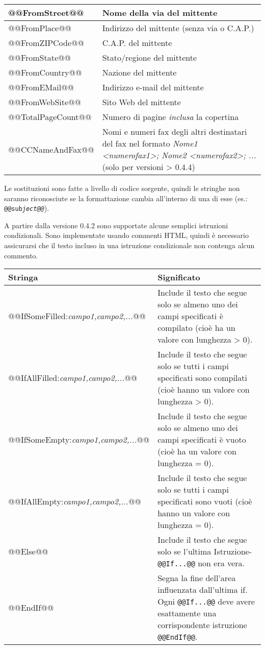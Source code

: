 \documentclass[a4paper,10pt]{scrartcl}
\begin{document}
\begin{center}
\begin{tabular}{|l|p{}|}
\ttfamily @@FromStreet@@ & Nome della via del mittente \\\hline
\ttfamily @@FromPlace@@ & Indirizzo del mittente (senza via o C.A.P.)\\\hline
\ttfamily @@FromZIPCode@@ & C.A.P. del mittente \\\hline
\ttfamily @@FromState@@ & Stato/regione del mittente\\\hline
\ttfamily @@FromCountry@@ & Nazione del mittente\\\hline
\ttfamily @@FromEMail@@ & Indirizzo e-mail del mittente\\\hline
\ttfamily @@FromWebSite@@ & Sito Web del mittente\\\hline
\ttfamily @@TotalPageCount@@ & Numero di pagine \textit{inclusa} la copertina \\\hline
\ttfamily @@CCNameAndFax@@ & Nomi e numeri fax degli altri destinatari del fax nel formato \textit{Nome1 <numerofax1>; Nome2 <numerofax2>; ...} (solo per versioni > 0.4.4)\\\hline
\end{tabular}
\end{center}

Le sostituzioni sono fatte a livello di codice sorgente, quindi le stringhe non saranno riconosciute se la formattazione cambia all'interno di una di esse (es.: \texttt{@@sub\textit{ject@@}}).

A partire dalla versione 0.4.2 sono supportate alcune semplici istruzioni condizionali. Sono implementate usando commenti HTML, quindi è necessario assicurarsi che il testo incluso in una istruzione condizionale non contenga alcun commento.
\begin{center}
\begin{tabular}{|l|p{}|}
\hline
\bfseries Stringa & \bfseries Significato \\
\hline\hline
\ttfamily @@IfSomeFilled:\textit{campo1,campo2,...}@@ & Include il testo che segue solo se almeno uno dei campi specificati è compilato (cioè ha un valore con lunghezza > 0).\\\hline
\ttfamily @@IfAllFilled:\textit{campo1,campo2,...}@@ & Include il testo che segue solo se tutti i campi specificati sono compilati (cioè hanno un valore con lunghezza > 0).\\\hline
\ttfamily @@IfSomeEmpty:\textit{campo1,campo2,...}@@ & Include il testo che segue solo se almeno uno dei campi specificati è vuoto (cioè ha un valore con lunghezza = 0).\\\hline
\ttfamily @@IfAllEmpty:\textit{campo1,campo2,...}@@ & Include il testo che segue solo se tutti i campi specificati sono vuoti (cioè hanno un valore con lunghezza = 0).\\\hline
\ttfamily @@Else@@ & Include il testo che segue solo se l'ultima Istruzione-\texttt{@@If...@@} non era vera.\\\hline
\ttfamily @@EndIf@@ & Segna la fine dell'area influenzata dall'ultima if. Ogni \texttt{@@If...@@} deve avere esattamente una corrispondente istruzione \texttt{@@EndIf@@}.\\\hline
\end{tabular}
\end{center}
\end{document}
